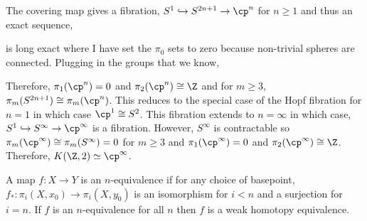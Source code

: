 \documentclass[12pt]{extarticle}
\begin{document}
\begin{example}
The covering map gives a fibration, $S^1 \hookrightarrow S^{2n + 1} \rightarrow \cp^n$ for $n \ge 1$ and thus an exact sequence,
\begin{center}
\end{center}
is long exact where I have set the $\pi_0$ sets to zero because non-trivial spheres are connected. Plugging in the groups that we know,
\begin{center}
\end{center}
Therefore, $\pi_1(\cp^n) = 0$ and $\pi_2(\cp^n) \cong \Z$ and for $m \ge 3$, $\pi_m(S^{2n + 1}) \cong \pi_m(\cp^n)$. This reduces to the special case of the Hopf fibration for $n = 1$ in which case $\cp^1 \cong S^2$. 
This fibration extends to $n = \infty$ in which case, $S^1 \hookrightarrow S^\infty \to \cp^\infty$ is a fibration. However, $S^\infty$ is contractable so $\pi_m(\cp^\infty) \cong \pi_m(S^\infty) = 0$ for $m \ge 3$ and $\pi_1(\cp^\infty) = 0$ and $\pi_2(\cp^\infty) \cong \Z$. Therefore, $K(\Z, 2) \simeq \cp^\infty$. 
\end{example}


\begin{definition}
A map $f : X \to Y$ is an $n$-equivalence if for any choice of basepoint, $f_* : \pi_i(X, x_0) \to \pi_i(X, y_0)$ is an isomorphism for $i < n$ and a surjection for $i = n$. If $f$ is an $n$-equivalence for all $n$ then $f$ is a weak homotopy equivalence. 
\end{definition} 
\end{document}
